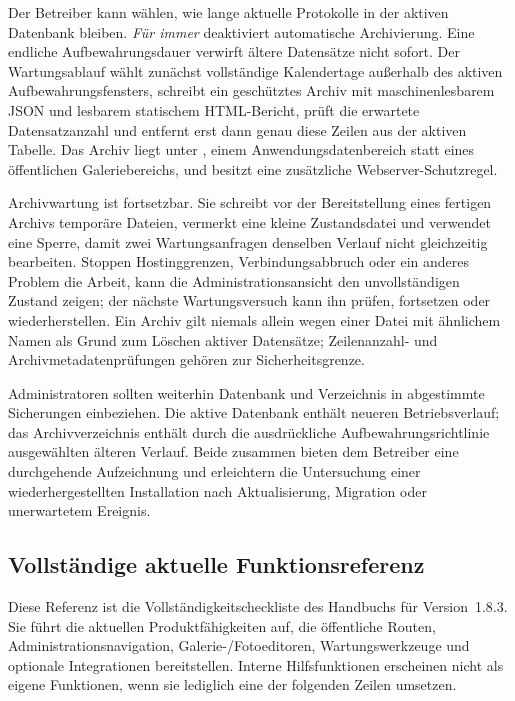 \documentclass[11pt,a4paper]{article}
\newcommand{\version}{1.8.3}
\newcommand{\filepath}[1]{\path{#1}}
\begin{document}
Der Betreiber kann wählen, wie lange aktuelle Protokolle in der aktiven
Datenbank bleiben. \emph{Für immer} deaktiviert automatische Archivierung. Eine
endliche Aufbewahrungsdauer verwirft ältere Datensätze nicht sofort. Der
Wartungsablauf wählt zunächst vollständige Kalendertage außerhalb des aktiven
Aufbewahrungsfensters, schreibt ein geschütztes Archiv mit maschinenlesbarem
JSON und lesbarem statischem HTML-Bericht, prüft die erwartete Datensatzanzahl
und entfernt erst dann genau diese Zeilen aus der aktiven Tabelle. Das Archiv
liegt unter \filepath{data/admin-log-archives/}, einem Anwendungsdatenbereich
statt eines öffentlichen Galeriebereichs, und besitzt eine zusätzliche
Webserver-Schutzregel.

Archivwartung ist fortsetzbar. Sie schreibt vor der Bereitstellung eines
fertigen Archivs temporäre Dateien, vermerkt eine kleine Zustandsdatei und
verwendet eine Sperre, damit zwei Wartungsanfragen denselben Verlauf nicht
gleichzeitig bearbeiten. Stoppen Hostinggrenzen, Verbindungsabbruch oder ein
anderes Problem die Arbeit, kann die Administrationsansicht den unvollständigen
Zustand zeigen; der nächste Wartungsversuch kann ihn prüfen, fortsetzen oder
wiederherstellen. Ein Archiv gilt niemals allein wegen einer Datei mit ähnlichem
Namen als Grund zum Löschen aktiver Datensätze; Zeilenanzahl- und
Archivmetadatenprüfungen gehören zur Sicherheitsgrenze.

Administratoren sollten weiterhin Datenbank und Verzeichnis
\filepath{data/admin-log-archives/} in abgestimmte Sicherungen einbeziehen. Die
aktive Datenbank enthält neueren Betriebsverlauf; das Archivverzeichnis enthält
durch die ausdrückliche Aufbewahrungsrichtlinie ausgewählten älteren Verlauf.
Beide zusammen bieten dem Betreiber eine durchgehende Aufzeichnung und
erleichtern die Untersuchung einer wiederhergestellten Installation nach
Aktualisierung, Migration oder unerwartetem Ereignis.
\subsection{Vollständige aktuelle Funktionsreferenz}
\label{sec:complete-feature-reference}

Diese Referenz ist die Vollständigkeitscheckliste des Handbuchs für
Version~\version{}. Sie führt die aktuellen Produktfähigkeiten auf, die
öffentliche Routen, Administrationsnavigation, Galerie-/Fotoeditoren,
Wartungswerkzeuge und optionale Integrationen bereitstellen. Interne
Hilfsfunktionen erscheinen nicht als eigene Funktionen, wenn sie lediglich eine
der folgenden Zeilen umsetzen.
\end{document}

